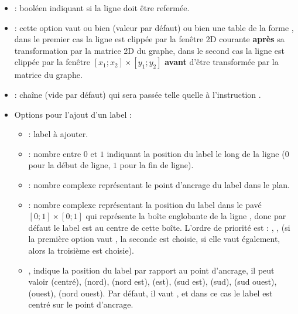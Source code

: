 \begin{itemize}
    \item {} : booléen indiquant si la ligne  doit être refermée.
    
    \item {} : cette option vaut ou bien \nil (valeur par défaut) ou bien une table de la forme ,  dans le premier cas la ligne est clippée par la fenêtre 2D courante \textbf{après} sa transformation par la matrice 2D du graphe, dans le second cas la ligne est clippée par la fenêtre $[x_1;x_2]\times[y_1;y_2]$ \textbf{avant} d'être transformée par la matrice du graphe.
    
    \item {} : chaîne (vide par défaut) qui sera passée telle quelle à l'instruction  \drawcmd.
    
    \item Options pour l'ajout d'un label :
        \begin{itemize}
            \item {} : label à ajouter.
            
            \item {} : nombre entre $0$ et $1$ indiquant la position du label le long de la ligne  ($0$ pour la début de ligne, $1$ pour la fin de ligne).
            
            \item {} : nombre complexe représentant le point d'ancrage du label dans le plan.
            
            \item {} : nombre complexe représentant la position du label dans le pavé $[0;1]\times[0;1]$ qui représente la boîte englobante de la ligne , donc par défaut le label est au centre de cette boîte.
            L'ordre de priorité est : , ,  (si la première option vaut \nil, la seconde est choisie, si elle vaut \nil également, alors la troisième est choisie).
            
            \item {}, indique la position du label par rapport au point d'ancrage, il peut valoir  (centré),  (nord),  (nord est),  (est),  (sud est),  (sud),  (sud ouest),  (ouest),  (nord ouest). Par défaut, il vaut , et dans ce cas le label est centré sur le point d'ancrage.
            

\end{itemize}
\end{itemize}
